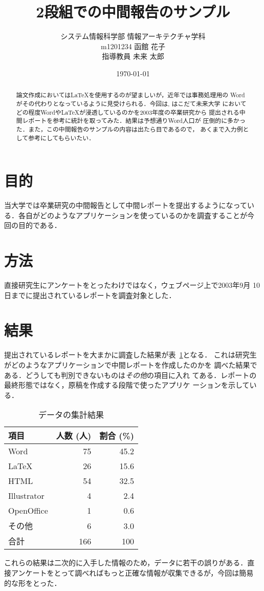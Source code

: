 ﻿\documentclass[twocolumn,papersize]{jsarticle}
\title{2段組での中間報告のサンプル}
\author{{\small システム情報科学部 情報アーキテクチャ学科}\\
m1201234 函館 花子 \\ 指導教員 未来 太郎}
\date{\today} %
\begin{document}
\begin{abstract}%
論文作成においては\LaTeX{}を使用するのが望ましいが，近年では事務処理用の
Wordがその代わりとなっているように見受けられる．今回は, はこだて未来大学
においてどの程度Wordや\LaTeX{}が浸透しているのかを2003年度の卒業研究から
提出される中間レポートを参考に統計を取ってみた．結果は予想通りWord人口が
圧倒的に多かった．また，この中間報告のサンプルの内容は出たら目であるので，
あくまで入力例として参考にしてもらいたい．
\end{abstract}
\maketitle%

\section{目的}
当大学では卒業研究の中間報告として中間レポートを提出するようになってい
る．各自がどのようなアプリケーションを使っているのかを調査することが今
回の目的である．

\section{方法}
直接研究生にアンケートをとったわけではなく，ウェブページ上で2003年9月
10日までに提出されているレポートを調査対象とした．

\section{結果}
提出されているレポートを大まかに調査した結果が表~\ref{2bansenji}となる．
これは研究生がどのようなアプリケーションで中間レポートを作成したのかを
調べた結果である．どうしても判別できないものは\emph{その他}の項目に入れ
てある．レポートの最終形態ではなく，原稿を作成する段階で使ったアプリケ
ーションを示している．
\begin{table}[htbp]
 \begin{center}
  \caption{データの集計結果}\label{2bansenji}
  \begin{tabular}{lrr}
   \hline
   項目        & 人数 (人)& 割合 (\%)  \\
   \hline
   Word        &  75 & 45.2  \\
   \LaTeX{}    &  26 & 15.6  \\
   HTML        &  54 & 32.5  \\
   Illustrator &   4 &  2.4  \\
   OpenOffice  &   1 &  0.6  \\
   その他      &   6 &  3.0  \\\hline
   合計        & 166 &  100  \\\hline
  \end{tabular}
 \end{center}
\end{table}
これらの結果は二次的に入手した情報のため，データに若干の誤りがある．直
接アンケートをとって調べればもっと正確な情報が収集できるが，今回は簡易
的な形をとった．
\end{document}
